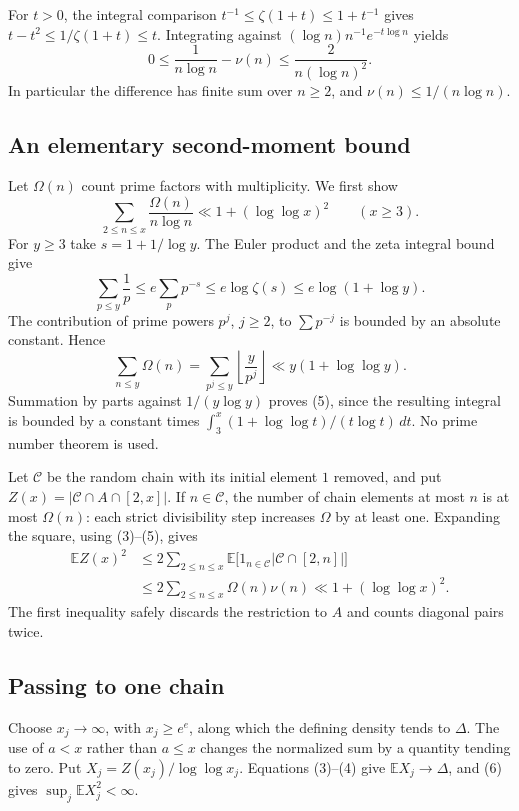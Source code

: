 For $t>0$, the integral comparison
$t^{-1}\le\zeta(1+t)\le1+t^{-1}$ gives
$t-t^2\le1/\zeta(1+t)\le t$. Integrating against
$(\log n)n^{-1}e^{-t\log n}$ yields
\[
 0\le\frac1{n\log n}-\nu(n)\le\frac2{n(\log n)^2}.
 \tag{4}
\]
In particular the difference has finite sum over $n\ge2$, and $\nu(n)\le1/(n\log n)$.

\subsection*{An elementary second-moment bound}
Let $\Omega(n)$ count prime factors with multiplicity. We first show
\[
 \sum_{2\le n\le x}\frac{\Omega(n)}{n\log n}
       \ll1+(\log\log x)^2\qquad(x\ge3).
 \tag{5}
\]
For $y\ge3$ take $s=1+1/\log y$. The Euler product and the zeta integral bound give
\[
 \sum_{p\le y}\frac1p
 \le e\sum_p p^{-s}\le e\log\zeta(s)
 \le e\log(1+\log y).
\]
The contribution of prime powers $p^j$, $j\ge2$, to
$\sum p^{-j}$ is bounded by an absolute constant. Hence
\[
 \sum_{n\le y}\Omega(n)
 =\sum_{p^j\le y}\left\lfloor\frac y{p^j}\right\rfloor
 \ll y(1+\log\log y).
\]
Summation by parts against $1/(y\log y)$ proves (5), since the resulting integral is bounded by a constant times
$\int_3^x(1+\log\log t)/(t\log t)\,dt$.
No prime number theorem is used.

Let $\mathcal C$ be the random chain with its initial element $1$ removed, and put
$Z(x)=|\mathcal C\cap A\cap[2,x]|$.
If $n\in\mathcal C$, the number of chain elements at most $n$ is at most $\Omega(n)$: each strict divisibility step increases $\Omega$ by at least one. Expanding the square, using (3)--(5), gives
\[
 \begin{split}
 \mathbb E Z(x)^2
 &\le2\sum_{2\le n\le x}
       \mathbb E\bigl[1_{n\in\mathcal C}|\mathcal C\cap[2,n]|\bigr]\\
 &\le2\sum_{2\le n\le x}\Omega(n)\nu(n)
 \ll1+(\log\log x)^2.
 \end{split}
 \tag{6}
\]
The first inequality safely discards the restriction to $A$ and counts diagonal pairs twice.

\subsection*{Passing to one chain}
Choose $x_j\to\infty$, with $x_j\ge e^e$, along which the defining density tends to $\Delta$. The use of $a<x$ rather than $a\le x$ changes the normalized sum by a quantity tending to zero. Put
$X_j=Z(x_j)/\log\log x_j$. Equations (3)--(4) give
$\mathbb E X_j\to\Delta$, and (6) gives $\sup_j\mathbb E X_j^2<\infty$.

